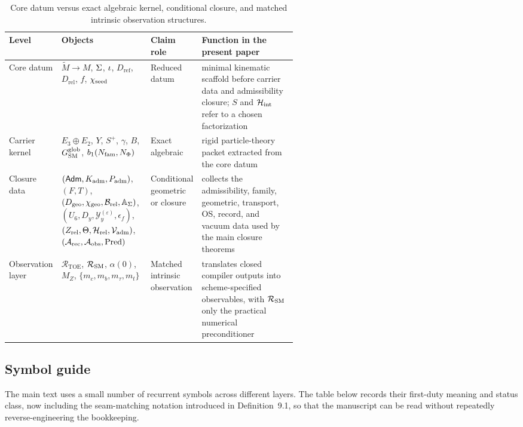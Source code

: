 \begin{table}[t]
\centering
\small
\begin{tabularx}{\linewidth}{@{}>{\raggedright\arraybackslash}p{0.12\linewidth}>{\raggedright\arraybackslash}p{0.31\linewidth}>{\raggedright\arraybackslash}p{0.13\linewidth}Y@{}}
\toprule
Level & Objects & Claim role & Function in the present paper \\
\midrule
Core datum & $\widetilde M\to M$, $\Sigma$, $\iota$, $D_{\mathrm{ref}}$, $D_{\mathrm{rel}}$, $f$, $\chi_{\mathrm{seed}}$ & Reduced datum & minimal kinematic scaffold before carrier data and admissibility closure; $S$ and $\mathcal H_{\mathrm{int}}$ refer to a chosen factorization \\
Carrier kernel & $E_3\oplus E_2$, $Y$, $S^+$, $\gamma$, $B$, $G_{\mathrm{SM}}^{\mathrm{glob}}$, $b_1(N_{\mathrm{fam}},N_\Phi)$ & Exact algebraic & rigid particle-theory packet extracted from the core datum \\
Closure data & $(\mathsf{Adm},K_{\mathrm{adm}},P_{\mathrm{adm}})$, $(F,T)$, $(D_{\mathrm{geo}},\chi_{\mathrm{geo}},\mathcal B_{\mathrm{rel}},\mathbb A_{\Sigma})$, $(U_6,D_y,\mathcal Y_y^{(\varepsilon)},\epsilon_f)$, $(Z_{\mathrm{rel}},\Theta,\mathcal H_{\mathrm{rel}},\mathcal V_{\mathrm{adm}})$, $(\mathcal A_{\mathrm{rec}},\mathcal A_{\mathrm{obs}},\operatorname{Pred})$ & Conditional geometric or closure & collects the admissibility, family, geometric, transport, OS, record, and vacuum data used by the main closure theorems \\
Observation layer & $\mathcal R_{\mathrm{TOE}}$, $\mathcal R_{\mathrm{SM}}$, $\alpha(0)$, $M_Z$, $\{m_c,m_b,m_\tau,m_t\}$ & Matched intrinsic observation & translates closed compiler outputs into scheme-specified observables, with $\mathcal R_{\mathrm{SM}}$ only the practical numerical preconditioner \\
\bottomrule
\end{tabularx}
\caption{Core datum versus exact algebraic kernel, conditional closure, and matched intrinsic observation structures.}
\label{tab:layered-datum}
\end{table}

\subsection{Symbol guide}

The main text uses a small number of recurrent symbols across different layers. The table below records their first-duty meaning and status class, now including the seam-matching notation introduced in Definition~9.1, so that the manuscript can be read without repeatedly reverse-engineering the bookkeeping.

